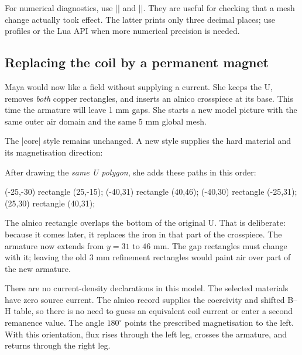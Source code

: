 
For numerical diagnostics, use
|| and |\femmB|. They are useful for checking that a mesh
change actually took effect. The latter prints only three decimal places;
use profiles or the Lua API when more numerical precision is needed.

\clearpage
\subsection{Replacing the coil by a permanent magnet}

Maya would now like a field without supplying a current. She keeps the U,
removes \emph{both} copper rectangles, and inserts an alnico crosspiece at its
base. This time the armature will leave 1 mm gaps. She starts a new model
picture with the same outer air domain and the same 5 mm global mesh.

The |core| style remains unchanged. A new style supplies the hard material
and its magnetisation direction:
\begin{codeexample}
\end{codeexample}
After drawing the \emph{same U polygon}, she adds these paths in this order:
\begin{codeexample}
\filldraw[magnet] (-25,-30) rectangle (25,-15);
\filldraw[core] (-40,31) rectangle (40,46);
 (-40,30) rectangle (-25,31);
 (25,30) rectangle (40,31);
\end{codeexample}
The alnico rectangle overlaps the bottom of the original U. That is deliberate:
because it comes later, it replaces the iron in that part of the crosspiece.
The armature now extends from $y=31$ to $46$ mm. The gap rectangles must change
with it; leaving the old 3 mm refinement rectangles would paint air over part
of the new armature.

There are no current-density declarations in this model. The selected materials
have zero source current. The alnico record supplies the coercivity and shifted
B--H table, so there is no need to guess an equivalent coil current or enter a
second remanence value. The angle $180^\circ$ points the prescribed magnetisation
to the left. With this orientation, flux rises through the left leg, crosses the
armature, and returns through the right leg.

